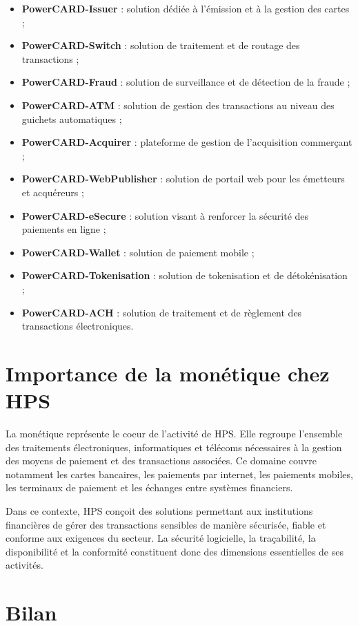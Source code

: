 \begin{itemize}
    \item \textbf{PowerCARD-Issuer} : solution dédiée à l'émission et à la gestion des cartes ;
    \item \textbf{PowerCARD-Switch} : solution de traitement et de routage des transactions ;
    \item \textbf{PowerCARD-Fraud} : solution de surveillance et de détection de la fraude ;
    \item \textbf{PowerCARD-ATM} : solution de gestion des transactions au niveau des guichets automatiques ;
    \item \textbf{PowerCARD-Acquirer} : plateforme de gestion de l'acquisition commerçant ;
    \item \textbf{PowerCARD-WebPublisher} : solution de portail web pour les émetteurs et acquéreurs ;
    \item \textbf{PowerCARD-eSecure} : solution visant à renforcer la sécurité des paiements en ligne ;
    \item \textbf{PowerCARD-Wallet} : solution de paiement mobile ;
    \item \textbf{PowerCARD-Tokenisation} : solution de tokenisation et de détokénisation ;
    \item \textbf{PowerCARD-ACH} : solution de traitement et de règlement des transactions électroniques.
\end{itemize}

\section{Importance de la monétique chez HPS}

La monétique représente le coeur de l'activité de HPS. Elle regroupe l'ensemble des traitements électroniques, informatiques et télécoms nécessaires à la gestion des moyens de paiement et des transactions associées. Ce domaine couvre notamment les cartes bancaires, les paiements par internet, les paiements mobiles, les terminaux de paiement et les échanges entre systèmes financiers.

Dans ce contexte, HPS conçoit des solutions permettant aux institutions financières de gérer des transactions sensibles de manière sécurisée, fiable et conforme aux exigences du secteur. La sécurité logicielle, la traçabilité, la disponibilité et la conformité constituent donc des dimensions essentielles de ses activités.

\section{Bilan}

